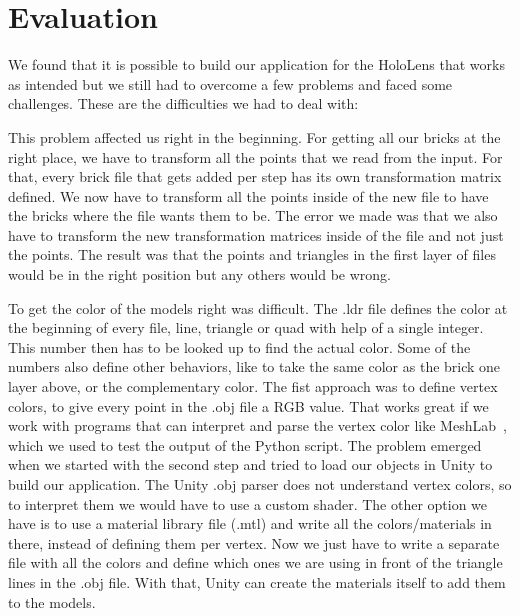 \chapter{Evaluation}
\label{cha:evaluation}

We found that it is possible to build our application for the HoloLens that works as intended but we still had to overcome a few problems and faced some challenges. These are the difficulties we had to deal with:

\begin{description}[align=left]
	\item [Wrong orientation matrix] 
	This problem affected us right in the beginning. For getting all our bricks at the right place, we have to transform all the points that we read from the input. For that, every brick file that gets added per step has its own transformation matrix defined. We now have to transform all the points inside of the new file to have the bricks where the file wants them to be. The error we made was that we also have to transform the new transformation matrices inside of the file and not just the points. The result was that the points and triangles in the first layer of files would be in the right position but any others would be wrong.
	
	\item [Color] 
	To get the color of the models right was difficult. The .ldr file defines the color at the beginning of every file, line, triangle or quad with help of a single integer. This number then has to be looked up to find the actual color. Some of the numbers also define other behaviors, like to take the same color as the brick one layer above, or the complementary color. \newline 
	The fist approach was to define vertex colors, to give every point in the .obj file a RGB value. That works great if we work with programs that can interpret and parse the vertex color like MeshLab~\cite{meshlab}, which we used to test the output of the Python script. The problem emerged when we started with the second step and tried to load our objects in Unity to build our application. The Unity .obj parser does not understand vertex colors, so to interpret them we would have to use a custom shader. \newline 
	The other option we have is to use a material library file (.mtl) and write all the colors/materials in there, instead of defining them per vertex. Now we just have to write a separate file with all the colors and define which ones we are using in front of the triangle lines in the .obj file. With that, Unity can create the materials itself to add them to the models.
	

\end{description}

